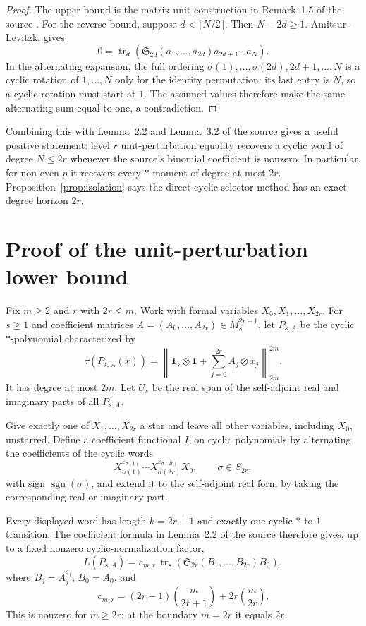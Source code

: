 \documentclass[11pt]{article}
\theoremstyle{remark}
\newcommand{\tr}{\operatorname{tr}}
\newcommand{\one}{\mathbf 1}
\newcommand{\Spol}{\mathfrak S}
\begin{document}
\begin{proof}
The upper bound is the matrix-unit construction in Remark~1.5 of the source
\cite{dls}.  For the reverse bound, suppose $d<\lceil N/2\rceil$.  Then
$N-2d\ge1$.  Amitsur--Levitzki gives
\[
 0=\tr_d\!\left(
 \Spol_{2d}(a_1,\ldots,a_{2d})a_{2d+1}\cdots a_N\right).
\]
In the alternating expansion, the full ordering
$\sigma(1),\ldots,\sigma(2d),2d+1,\ldots,N$ is a cyclic rotation of
$1,\ldots,N$ only for the identity permutation: its last entry is $N$, so a
cyclic rotation must start at $1$.  The assumed values therefore make the
same alternating sum equal to one, a contradiction.
\end{proof}

Combining this with Lemma~2.2 and Lemma~3.2 of the source gives a useful
positive statement: level $r$ unit-perturbation equality recovers a cyclic
word of degree $N\le2r$ whenever the source's binomial coefficient is
nonzero.  In particular, for non-even $p$ it recovers every $*$-moment of
degree at most $2r$.  Proposition~\ref{prop:isolation} says the direct
cyclic-selector method has an exact degree horizon $2r$.

\section{Proof of the unit-perturbation lower bound}

Fix $m\ge2$ and $r$ with $2r\le m$.  Work with formal variables
$X_0,X_1,\ldots,X_{2r}$.  For $s\ge1$ and coefficient matrices
$A=(A_0,\ldots,A_{2r})\in M_s^{2r+1}$, let $P_{s,A}$ be the cyclic
$*$-polynomial characterized by
\begin{equation}\label{eq:P}
 \tau(P_{s,A}(x))
 =\left\|\one_s\otimes\one+\sum_{j=0}^{2r}A_j\otimes x_j
  \right\|_{2m}^{2m}.
\end{equation}
It has degree at most $2m$.  Let $U_s$ be the real span of the self-adjoint
real and imaginary parts of all $P_{s,A}$.

Give exactly one of $X_1,\ldots,X_{2r}$ a star and leave all other variables,
including $X_0$, unstarred.  Define a coefficient functional $L$ on cyclic
polynomials by alternating the coefficients of the cyclic words
\[
 X_{\sigma(1)}^{\varepsilon_{\sigma(1)}}\cdots
 X_{\sigma(2r)}^{\varepsilon_{\sigma(2r)}}X_0,
 \qquad \sigma\in S_{2r},
\]
with sign $\operatorname{sgn}(\sigma)$, and extend it to the self-adjoint
real form by taking the corresponding real or imaginary part.

Every displayed word has length $k=2r+1$ and exactly one cyclic
$*$-to-$1$ transition.  The coefficient formula in Lemma~2.2 of the source
therefore gives, up to a fixed nonzero cyclic-normalization factor,
\begin{equation}\label{eq:LPA}
 L(P_{s,A})=
 c_{m,r}\,\tr_s\!\left(
 \Spol_{2r}(B_1,\ldots,B_{2r})B_0\right),
\end{equation}
where $B_j=A_j^{\varepsilon_j}$, $B_0=A_0$, and
\begin{equation}\label{eq:c}
 c_{m,r}=(2r+1)\binom{m}{2r+1}+2r\binom{m}{2r}.
\end{equation}
This is nonzero for $m\ge2r$; at the boundary $m=2r$ it equals $2r$.
\end{document}
